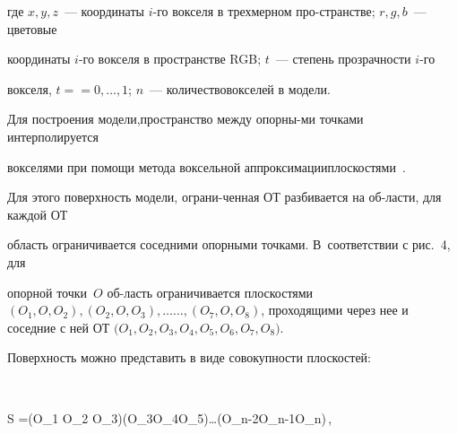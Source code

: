 \noindent


где $x,y,z$~--- координаты $i$-го вокселя в трехмерном про-\linebreak странстве; $r,g,b$~--- цветовые 


координаты $i$-го вокселя в пространстве RGB; $t$~--- степень прозрачности $i$-го 


вокселя, $t=$\linebreak $=0,\ldots , 1$; $n$~--- количество\linebreak вокселей в модели.





Для построения модели,\linebreak пространство между опорны-\linebreak ми точками интерполируется\linebreak 


вокселями при помощи метода воксельной аппроксимации\linebreak плоскостями~\cite{8-7, 9-7}. 


Для этого поверхность модели, ограни-\linebreak ченная ОТ разбивается на об-\linebreak ласти, для каждой ОТ 


область ограничивается соседними опорными точками. В~соответствии с рис.~4, для 


опорной точки~$O$ об-\linebreak ласть ограничивается плоскостями $(O_1, O, O_2), (O_2, O, O_3), 


\ldots$\linebreak $\ldots , (O_7, O, O_8)$, проходящими через нее и соседние с ней ОТ $(O_1,$\linebreak $ O_2, O_3, O_4, 


O_5, O_6, O_7, O_8)$. 








       


Поверхность можно представить в виде совокупности плоскостей:


\pagebreak





\noindent


$$


S =(O_1 O_2 O_3)\cup (O_3O_4O_5)\cup\ldots\cup(O_{n-2}O_{n-1}O_n)\,,


